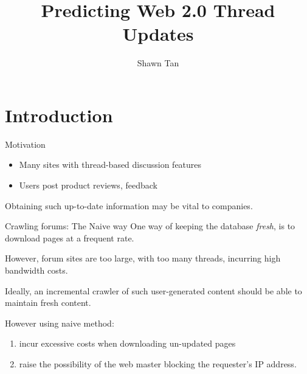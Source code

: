 \documentclass[compress]{beamer}
\title{Predicting Web 2.0 Thread Updates}
\author{Shawn Tan}
\date{}
\begin{document}
\maketitle
\section{Introduction}

\begin{frame}{Motivation}
	\begin{itemize}
		\item Many sites with thread-based discussion features
		\item Users post product reviews, feedback
	\end{itemize}
	Obtaining such up-to-date information may be vital to companies.
\end{frame}

\begin{frame}{Crawling forums: The Naive way}
	One way of keeping the database \emph{fresh}, is to download pages at a frequent rate.

	However, forum sites are too large, with too many threads, incurring high bandwidth costs.
\end{frame}

\begin{frame}
Ideally, an incremental crawler of such user-generated content should be able to maintain fresh content.

However using naive method:
	\begin{enumerate}
		\item incur excessive costs when downloading un-updated pages
		\item raise the possibility of the web master blocking the requester's IP address.
	\end{enumerate}
\end{frame}
\end{document}
